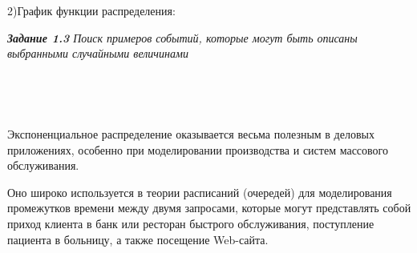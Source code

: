 \documentclass[a4paper,12pt, oneside]{book}
\begin{document}
{{2)График функции распределения:\\
\begin{minipage}[h]{0.55\linewidth}	
\end{minipage}









\newpage
\textit{\textbf{Задание 1.3} Поиск примеров событий, которые могут быть описаны выбранными случайными величинами}
\vspace{5mm}

\vspace{5mm}
\\
\vspace{5mm}

\vspace{5mm}
\\
\vspace{5mm}

Экспоненциальное распределение оказывается весьма полезным в деловых приложениях, особенно при моделировании производства и систем массового обслуживания. 

Оно широко используется в теории расписаний (очередей) для моделирования промежутков времени между двумя запросами, которые могут представлять собой приход клиента в банк или ресторан быстрого обслуживания, поступление пациента в больницу, а также посещение Web-сайта.

}}
\end{document}
